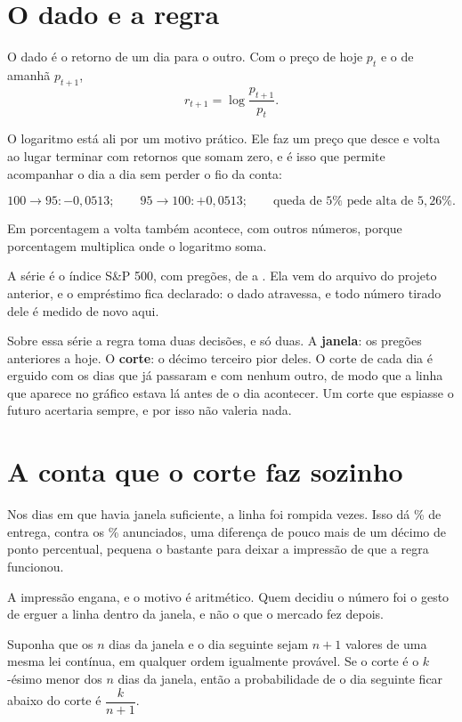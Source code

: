 \section{O dado e a regra}

O dado é o retorno de um dia para o outro. Com o preço de hoje $p_t$ e o de amanhã
$p_{t+1}$,
\[
  r_{t+1} = \log \frac{p_{t+1}}{p_t}.
\]

O logaritmo está ali por um motivo prático. Ele faz um preço que desce e volta ao lugar
terminar com retornos que somam zero, e é isso que permite acompanhar o dia a dia sem perder o
fio da conta:

\[ 100 \to 95: -0{,}0513; \qquad 95 \to 100: +0{,}0513; \qquad \text{queda de } 5\% \text{ pede alta de } 5{,}26\% . \] %

Em porcentagem a volta também acontece, com outros números, porque porcentagem multiplica
onde o logaritmo soma.

A série é o índice S\&P 500, %
com \numSerieDias{} pregões, de \numSerieInicio{} a \numSerieFim. Ela vem do arquivo do
projeto anterior, e o empréstimo fica declarado: o dado atravessa, e todo número tirado dele é
medido de novo aqui.

Sobre essa série a regra toma duas decisões, e só duas. A \textbf{janela}: os
\numCorteJanela{} pregões anteriores a hoje. O \textbf{corte}: o décimo terceiro pior deles.
O corte de cada dia é erguido com os dias que já passaram e com nenhum outro, de modo que a
linha que aparece no gráfico estava lá antes de o dia acontecer. Um corte que espiasse o
futuro acertaria sempre, e por isso não valeria nada.

\section{A conta que o corte faz sozinho}

Nos \numEntregaDias{} dias em que havia janela suficiente, a linha foi rompida
\numEntregaViolacoes{} vezes. Isso dá \numEntregaTaxaPct\% de entrega, contra os
\numPromessaPct\% anunciados, uma diferença de pouco mais de um décimo de ponto percentual, pequena o
bastante para deixar a impressão de que a regra funcionou.

A impressão engana, e o motivo é aritmético. Quem decidiu o número foi o gesto de erguer a
linha dentro da janela, e não o que o mercado fez depois.

\begin{proposicao}
\label{prop:conta}
Suponha que os $n$ dias da janela e o dia seguinte sejam $n+1$ valores de uma mesma lei
contínua, em qualquer ordem igualmente provável. Se o corte é o $k$-ésimo menor dos $n$
dias da janela, então a probabilidade de o dia seguinte ficar abaixo do corte é
$\dfrac{k}{n+1}$.
\end{proposicao}

